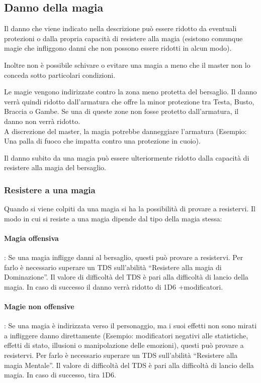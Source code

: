 \documentclass[../manuale_main.tex]{subfiles}
\begin{document}
\subsection{Danno della magia}
Il danno che viene indicato nella descrizione può essere ridotto da eventuali protezioni o dalla propria capacità di resistere alla magia (esistono comunque magie che infliggono danni che non possono essere ridotti in alcun modo).

Inoltre non è possibile schivare o evitare una magia a meno che il master non lo conceda sotto particolari condizioni.

Le magie vengono indirizzate contro la zona meno protetta del bersaglio. Il danno verrà quindi ridotto dall'armatura che offre la minor protezione tra Testa, Busto, Braccia o Gambe. Se una di queste zone non fosse protetto dall'armatura, il danno non verrà ridotto.\\
A discrezione del master, la magia potrebbe danneggiare l'armatura (Esempio: Una palla di fuoco che impatta contro una protezione in cuoio).

Il danno subito da una magia può essere ulteriormente ridotto dalla capacità di resistere alla magia del bersaglio.


\subsubsection{Resistere a una magia}
Quando si viene colpiti da una magia si ha la possibilità di provare a resistervi. Il modo in cui si resiste a una magia dipende dal tipo della magia stessa:
\paragraph{\textbf{Magia offensiva}}: Se una magia infligge danni al bersaglio, questi può provare a resistervi. Per farlo è necessario superare un TDS sull’abilità “Resistere alla magia di Dominazione”. Il valore di difficoltà del TDS è pari alla difficoltà di lancio della magia. In caso di successo il danno verrà ridotto di 1D6 +modificatori.
\paragraph{\textbf{Magie non offensive}}: Se una magia è indirizzata verso il personaggio, ma i suoi effetti non sono mirati a infliggere danno direttamente (Esempio: modificatori negativi alle statistiche, effetti di stato, illusioni o manipolazione delle emozioni), questi può provare a resistervi. Per farlo è necessario superare un TDS sull’abilità “Resistere alla magia Mentale”. Il valore di difficoltà del TDS è pari alla difficoltà di lancio della magia. In caso di successo, tira 1D6.
\end{document}

